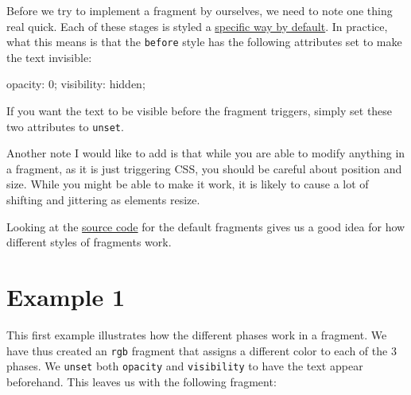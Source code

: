 \documentclass[
  letterpaper,
  DIV=11,
  numbers=noendperiod]{scrreprt}
\newenvironment{Shaded}{\begin{snugshade}}{\end{snugshade}}
\newcommand{\InformationTok}[1]{\textcolor[rgb]{0.37,0.37,0.37}{#1}}
\newcommand{\NormalTok}[1]{\textcolor[rgb]{0.00,0.23,0.31}{#1}}
\begin{document}
Before we try to implement a fragment by ourselves, we need to note one
thing real quick. Each of these stages is styled a
\href{https://github.com/quarto-dev/quarto-cli/blob/39dc173c4869ebaf4d6bb087a972acb87533b64e/src/resources/formats/revealjs/reveal/css/reveal.scss\#L51-L65}{specific
way by default}. In practice, what this means is that the
\texttt{before} style has the following attributes set to make the text
invisible:

\begin{Shaded}
\begin{Highlighting}[]
\NormalTok{opacity}\InformationTok{:}\NormalTok{ 0;}
\NormalTok{visibility}\InformationTok{:}\NormalTok{ hidden;}
\end{Highlighting}
\end{Shaded}

If you want the text to be visible before the fragment triggers, simply
set these two attributes to \texttt{unset}.

Another note I would like to add is that while you are able to modify
anything in a fragment, as it is just triggering CSS, you should be
careful about position and size. While you might be able to make it
work, it is likely to cause a lot of shifting and jittering as elements
resize.

\begin{tcolorbox}[enhanced jigsaw, titlerule=0mm, bottomrule=.15mm, opacityback=0, colbacktitle=quarto-callout-tip-color!10!white, colframe=quarto-callout-tip-color-frame, coltitle=black, breakable, toprule=.15mm, colback=white, bottomtitle=1mm, title=\textcolor{quarto-callout-tip-color}{\faLightbulb}\hspace{0.5em}{Tip}, toptitle=1mm, arc=.35mm, left=2mm, leftrule=.75mm, rightrule=.15mm, opacitybacktitle=0.6]

Looking at the
\href{https://github.com/quarto-dev/quarto-cli/blob/39dc173c4869ebaf4d6bb087a972acb87533b64e/src/resources/formats/revealjs/reveal/css/reveal.scss\#L67-L207}{source
code} for the default fragments gives us a good idea for how different
styles of fragments work.

\end{tcolorbox}

\section{Example 1}\label{example-1}

This first example illustrates how the different phases work in a
fragment. We have thus created an \texttt{rgb} fragment that assigns a
different color to each of the 3 phases. We \texttt{unset} both
\texttt{opacity} and \texttt{visibility} to have the text appear
beforehand. This leaves us with the following fragment:
\end{document}
